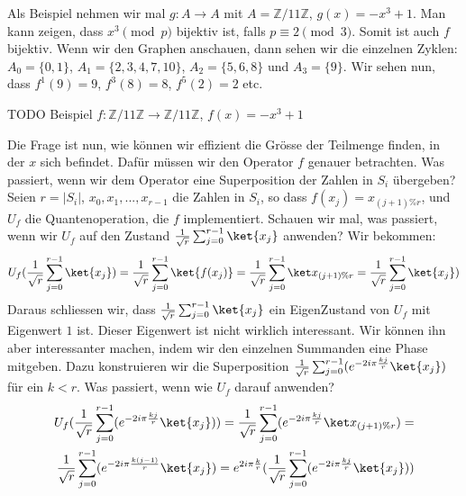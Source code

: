 Als Beispiel nehmen wir mal $g : A \rightarrow A$ mit $A = \mathbb{Z}/11\mathbb{Z}$, $g(x) = -x^3 + 1$. Man kann zeigen, dass $x^3 \pmod{p}$ bijektiv ist, falls $p \equiv 2 \pmod 3$. Somit ist auch $f$ bijektiv. Wenn wir den Graphen anschauen, dann sehen wir die einzelnen Zyklen: $A_0 = \{0, 1\}$, $A_1 = \{2, 3, 4, 7, 10\}$, $A_2 = \{5, 6, 8\}$ und $A_3 = \{9\}$. Wir sehen nun, dass $f^1(9) = 9$, $f^3(8) = 8$, $f^5(2) = 2$ etc. 

TODO Beispiel $f : \mathbb{Z} / 11 \mathbb{Z} \rightarrow \mathbb{Z} / 11 \mathbb{Z} $, $f(x) = -x^3 + 1$


Die Frage ist nun, wie können wir effizient die Grösse der Teilmenge finden, in der $x$ sich befindet. Dafür müssen wir den Operator $f$ genauer betrachten. Was passiert, wenn wir dem Operator eine Superposition der Zahlen in $S_i$ übergeben? Seien $r = |S_i|$, $x_0, x_1, ..., x_{r - 1}$ die Zahlen in $S_i$, so dass $f(x_j) = x_{(j + 1) \% r}$, und $U_f$ die Quantenoperation, die $f$ implementiert. Schauen wir mal, was passiert, wenn wir $U_f$ auf den Zustand $\frac{1}{\sqrt{r}}\sum_{j = 0}^{r - 1}\ket{x_j}$ anwenden? Wir bekommen:
\begin{align*}
    U_f(\frac{1}{\sqrt{r}}\sum_{j = 0}^{r - 1}\ket{x_j}) = \frac{1}{\sqrt{r}}\sum_{j = 0}^{r - 1}\ket{f(x_j)} = \frac{1}{\sqrt{r}}\sum_{j = 0}^{r - 1}\ket{x_{(j + 1) \% r}} = \frac{1}{\sqrt{r}}\sum_{j = 0}^{r - 1}\ket{x_j})
\end{align*}
Daraus schliessen wir, dass $\frac{1}{\sqrt{r}}\sum_{j = 0}^{r - 1}\ket{x_j}$ ein EigenZustand von $U_f$ mit Eigenwert $1$ ist. Dieser Eigenwert ist nicht wirklich interessant. Wir können ihn aber interessanter machen, indem wir den einzelnen Summanden eine Phase mitgeben. Dazu konstruieren wir die Superposition $\frac{1}{\sqrt{r}}\sum_{j = 0}^{r - 1}(e^{-2i\pi\frac{kj}{r}}\ket{x_j})$ für ein $k < r$. Was passiert, wenn wie $U_f$ darauf anwenden? 
\begin{align*}
    U_f(\frac{1}{\sqrt{r}}\sum_{j = 0}^{r - 1}(e^{-2i\pi\frac{kj}{r}}\ket{x_j})) = \frac{1}{\sqrt{r}}\sum_{j = 0}^{r - 1}(e^{-2i\pi\frac{kj}{r}}\ket{x_{(j + 1) \% r}}) = \\
    \frac{1}{\sqrt{r}}\sum_{j = 0}^{r - 1}(e^{-2i\pi\frac{k(j - 1)}{r}}\ket{x_j}) = e^{2i\pi\frac{k}{r}}(\frac{1}{\sqrt{r}}\sum_{j = 0}^{r - 1}(e^{-2i\pi\frac{kj}{r}}\ket{x_j}))
\end{align*}
